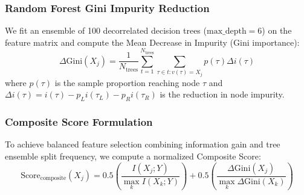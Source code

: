 \subsubsection{Random Forest Gini Impurity Reduction}
We fit an ensemble of 100 decorrelated decision trees ($\text{max\_depth} = 6$) on the feature matrix and compute the Mean Decrease in Impurity (Gini importance):
\begin{equation}
    \Delta \text{Gini}(X_j) = \frac{1}{N_{\text{trees}}} \sum_{t=1}^{N_{\text{trees}}} \sum_{\tau \in t: v(\tau) = X_j} p(\tau) \Delta i(\tau)
\end{equation}
where $p(\tau)$ is the sample proportion reaching node $\tau$ and $\Delta i(\tau) = i(\tau) - p_L i(\tau_L) - p_R i(\tau_R)$ is the reduction in node impurity.

\subsubsection{Composite Score Formulation}
To achieve balanced feature selection combining information gain and tree ensemble split frequency, we compute a normalized Composite Score:
\begin{equation}
    \text{Score}_{\text{composite}}(X_j) = 0.5 \left( \frac{I(X_j; Y)}{\max_k I(X_k; Y)} \right) + 0.5 \left( \frac{\Delta \text{Gini}(X_j)}{\max_k \Delta \text{Gini}(X_k)} \right)
    \label{eq:composite_score}
\end{equation}

